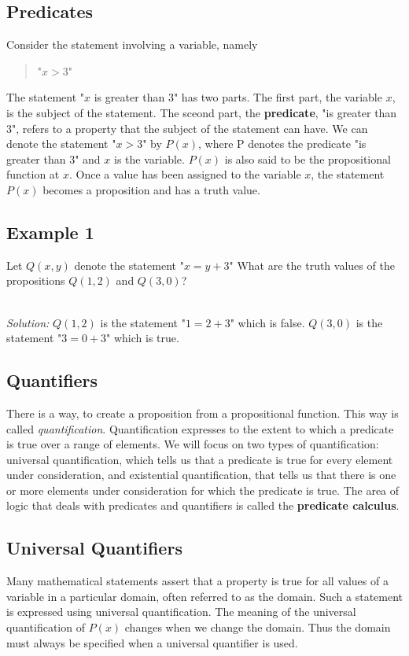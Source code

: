 \documentclass{article}
\begin{document}
\subsection{Predicates}
Consider the statement involving a variable, namely

\begin{quote}
	"$x > 3$"
\end{quote}

\noindent The statement "$x$ is greater than 3" has two parts. The first part, the variable $x$, is the subject
of the statement. The sceond part, the \textbf{predicate}, "is greater than 3", refers to a property that
the subject of the statement can have. We can denote the statement "$x > 3$" by $P(x)$,
where P denotes the predicate "is greater than 3" and $x$ is the variable. $P(x)$ is also said to be the
propositional function at $x$. Once a value has been assigned to the variable $x$, the statement $P(x)$ becomes
a proposition and has a truth value.

\subsection*{Example 1}
Let $Q(x,y)$ denote the statement "$x = y + 3$" What are the truth values of the propositions $Q(1,2)$ and $Q(3,0)$?

\noindent \\ \textit{Solution:} $Q(1,2)$ is the statement "$1 = 2+3$" which is false. $Q(3,0)$ is the statement
"$3=0+3$" which is true.

\subsection{Quantifiers}
There is a way, to create a proposition from a propositional function. This way is called \textit{quantification}.
Quantification expresses to the extent to which a predicate is true over a range of elements. We will focus on two types
of quantification: universal quantification, which tells us that a predicate is true for every element under consideration, and
existential quantification, that tells us that there is one or more elements under consideration for which the predicate is true.
The area of logic that deals with predicates and quantifiers is called the \textbf{predicate calculus}.

\subsection*{Universal Quantifiers}
Many mathematical statements assert that a property is true for all values of a variable in a particular domain,
often referred to as the domain. Such a statement is expressed using universal quantification. The meaning of the
universal quantification of $P(x)$ changes when we change the domain. Thus the domain must always be specified when
a universal quantifier is used.
\end{document}
